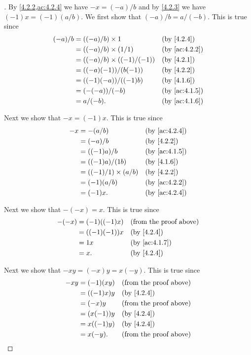 \begin{proof}[]
  By \cref{4.2.2,ac:4.2.4} we have \(-x = (-a) / b\) and by \cref{4.2.3} we have \((-1) x = (-1) (a / b)\).
  We first show that \((-a) / b = a / (-b)\).
  This is true since
  \begin{align*}
    (-a) / b & = ((-a) / b) \times 1             &  & \by{4.2.4}    \\
             & = ((-a) / b) \times (1 / 1)       &  & \by{ac:4.2.2} \\
             & = ((-a) / b) \times ((-1) / (-1)) &  & \by{4.2.1}    \\
             & = ((-a) (-1)) / (b (-1))          &  & \by{4.2.2}    \\
             & = ((-1) (-a)) / ((-1) b)          &  & \by{4.1.6}    \\
             & = (-(-a)) / (-b)                  &  & \by{ac:4.1.5} \\
             & = a / (-b).                       &  & \by{ac:4.1.6}
  \end{align*}

  Next we show that \(-x = (-1) x\).
  This is true since
  \begin{align*}
    -x & = -(a / b)                  &  & \by{ac:4.2.4} \\
       & = (-a) / b                  &  & \by{4.2.2}    \\
       & = ((-1) a) / b              &  & \by{ac:4.1.5} \\
       & = ((-1) a) / (1b)           &  & \by{4.1.6}    \\
       & = ((-1) / 1) \times (a / b) &  & \by{4.2.2}    \\
       & = (-1) (a / b)              &  & \by{ac:4.2.2} \\
       & = (-1) x.                   &  & \by{ac:4.2.4}
  \end{align*}

  Next we show that \(-(-x) = x\).
  This is true since
  \begin{align*}
    -(-x) & = (-1) ((-1) x) &  & \text{(from the proof above)} \\
          & = ((-1) (-1)) x &  & \by{4.2.4}                    \\
          & = 1 x           &  & \by{ac:4.1.7}                 \\
          & = x.            &  & \by{4.2.4}
  \end{align*}

  Next we show that \(-xy = (-x) y = x (-y)\).
  This is true since
  \begin{align*}
    -xy & = (-1) (xy)  &  & \text{(from the proof above)} \\
        & = ((-1) x) y &  & \by{4.2.4}                    \\
        & = (-x) y     &  & \text{(from the proof above)} \\
        & = (x (-1)) y &  & \by{4.2.4}                    \\
        & = x ((-1) y) &  & \by{4.2.4}                    \\
        & = x (-y).    &  & \text{(from the proof above)}
  \end{align*}


\end{proof}

